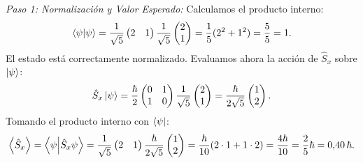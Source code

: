 \begin{ejemplobox}
    \textit{Paso 1: Normalización y Valor Esperado:}
    Calculamos el producto interno:
    \begin{equation}
        \left\langle \psi \middle| \psi \right\rangle = \frac{1}{\sqrt{5}}\begin{pmatrix} 2 & 1 \end{pmatrix} \frac{1}{\sqrt{5}}\begin{pmatrix} 2 \\ 1 \end{pmatrix} = \frac{1}{5}(2^2 + 1^2) = \frac{5}{5} = 1.
    \end{equation}
    El estado está correctamente normalizado. Evaluamos ahora la acción de $\hat{S}_x$ sobre $\left| \psi \right\rangle$:
    \begin{equation}
        \hat{S}_x \left| \psi \right\rangle = \frac{\hbar}{2}\begin{pmatrix} 0 & 1 \\ 1 & 0 \end{pmatrix} \frac{1}{\sqrt{5}}\begin{pmatrix} 2 \\ 1 \end{pmatrix} = \frac{\hbar}{2\sqrt{5}}\begin{pmatrix} 1 \\ 2 \end{pmatrix}.
    \end{equation}
    Tomando el producto interno con $\left\langle \psi \right|$:
    \begin{equation}
        \left\langle \hat{S}_x \right\rangle = \left\langle \psi \middle| \hat{S}_x\psi \right\rangle = \frac{1}{\sqrt{5}}\begin{pmatrix} 2 & 1 \end{pmatrix} \frac{\hbar}{2\sqrt{5}}\begin{pmatrix} 1 \\ 2 \end{pmatrix} = \frac{\hbar}{10}(2\cdot 1 + 1\cdot 2) = \frac{4\hbar}{10} = \frac{2}{5}\hbar = 0{,}40\,\hbar.
    \end{equation}


\end{ejemplobox}
